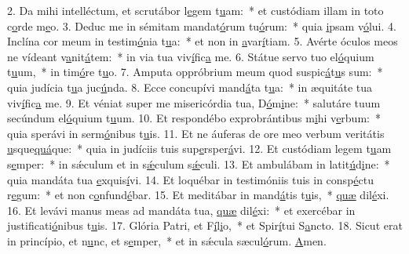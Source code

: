 2. Da mihi intelléctum, et scrutábor l\uline{e}gem t\uline{u}am:~* et custódiam illam in toto c\uline{o}rde m\uline{e}o.
3. Deduc me in sémitam mandat\uline{ó}rum tu\uline{ó}rum:~* quia \uline{i}psam v\uline{ó}lui.
4. Inclína cor meum in testim\uline{ó}nia t\uline{u}a:~* et non in \uline{a}var\uline{í}tiam.
5. Avérte óculos meos ne vídeant v\uline{a}nit\uline{á}tem:~* in via tua viv\uline{í}fic\uline{a} me.
6. Státue servo tuo el\uline{ó}quium t\uline{u}um,~* in tim\uline{ó}re t\uline{u}o.
7. Amputa oppróbrium meum quod suspic\uline{á}t\uline{u}s sum:~* quia judícia t\uline{u}a juc\uline{ú}nda.
8. Ecce concupívi mand\uline{á}ta t\uline{u}a:~* in æquitáte tua viv\uline{í}fic\uline{a} me.
9. Et véniat super me misericórdia tua, D\uline{ó}m\uline{i}ne:~* salutáre tuum secúndum el\uline{ó}quium t\uline{u}um.
10. Et respondébo exprobrántibus m\uline{i}hi v\uline{e}rbum:~* quia sperávi in serm\uline{ó}nibus t\uline{u}is.
11. Et ne áuferas de ore meo verbum veritátis \uline{u}sque\uline{quá}que:~* quia in judíciis tuis sup\uline{e}rsper\uline{á}vi.
12. Et custódiam legem t\uline{u}am s\uline{e}mper:~* in sǽculum et in s\uline{ǽ}culum s\uline{ǽ}culi.
13. Et ambulábam in latit\uline{ú}d\uline{i}ne:~* quia mandáta tua \uline{e}xquis\uline{í}vi.
14. Et loquébar in testimóniis tuis in consp\uline{é}ctu r\uline{e}gum:~* et non c\uline{o}nfund\uline{é}bar.
15. Et meditábar in mand\uline{á}tis t\uline{u}is,~* \uline{quæ} dil\uline{é}xi.
16. Et levávi manus meas ad mandáta tua, \uline{quæ} dil\uline{é}xi:~* et exercébar in justificati\uline{ó}nibus t\uline{u}is.
17. Glória Patri, et F\uline{í}l\uline{i}o,~* et Spir\uline{í}tui S\uline{a}ncto.
18. Sicut erat in princípio, et n\uline{u}nc, et s\uline{e}mper,~* et in sǽcula sæcul\uline{ó}rum. \uline{A}men.
